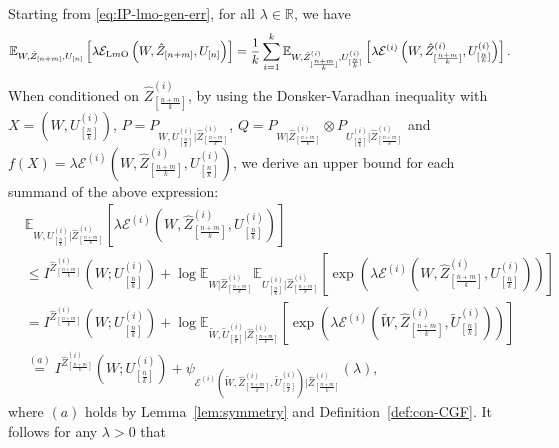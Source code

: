 \documentclass[onecolumn,romanappendices,10pt]{IEEEtran}
\newcommand{\Ecal}{{\mathcal E}}
\newcommand{\EE}{{\mathbb{E}}}
\newcommand{\RR}{{\mathbb{R}}}
\begin{document}
	Starting from \eqref{eq:IP-lmo-gen-err}, for all $\lambda \in \RR$, we have
	\begin{equation}
		\begin{aligned}
			\EE_{W, \hat{Z}_{[n+m]}, U_{[n]}} \left[ \lambda \Ecal_{\textnormal{L$m$O}}\left( W, \hat{Z}_{[n+m]}, U_{[n]} \right) \right] = \frac{1}{k} \sum_{i=1}^{k} \EE_{W, \hat{Z}^{(i)}_{[\frac{n+m}{k}]}, U^{(i)}_{[\frac{n}{k}]}} \left[ \lambda \Ecal^{(i)} \left( W, \hat{Z}^{(i)}_{[\frac{n+m}{k}]}, U^{(i)}_{[\frac{n}{k}]} \right) \right].
		\end{aligned}
	\end{equation}
	When conditioned on $\hat{Z}^{(i)}_{[\frac{n+m}{k}]}$, by using the Donsker-Varadhan inequality with $X = (W, U^{(i)}_{[\frac{n}{k}]})$, $P = P_{W, U^{(i)}_{[\frac{n}{k}]} | \hat{Z}^{(i)}_{[\frac{n+m}{k}]}}$, $Q = P_{W | \hat{Z}^{(i)}_{[\frac{n+m}{k}]}} \otimes P_{U^{(i)}_{[\frac{n}{k}]} | \hat{Z}^{(i)}_{[\frac{n+m}{k}]}}$ and $f(X) = \lambda \Ecal^{(i)} ( W, \hat{Z}^{(i)}_{[\frac{n+m}{k}]}, U^{(i)}_{[\frac{n}{k}]} )$, we derive an upper bound for each summand of the above expression:
	\begin{equation}
		\begin{aligned}
			&\EE_{W, U^{(i)}_{[\frac{n}{k}]} | \hat{Z}^{(i)}_{[\frac{n+m}{k}]}} \left[ \lambda \Ecal^{(i)} \left( W, \hat{Z}^{(i)}_{[\frac{n+m}{k}]}, U^{(i)}_{[\frac{n}{k}]} \right) \right] \\
			&\leq I^{\hat{Z}^{(i)}_{[\frac{n+m}{k}]}}\left( W; U^{(i)}_{[\frac{n}{k}]} \right) + \log \EE_{W | \hat{Z}^{(i)}_{[\frac{n+m}{k}]}} \EE_{U^{(i)}_{[\frac{n}{k}]} | \hat{Z}^{(i)}_{[\frac{n+m}{k}]}} \left[ \exp \left( \lambda \Ecal^{(i)} \left( W, \hat{Z}^{(i)}_{[\frac{n+m}{k}]}, U^{(i)}_{[\frac{n}{k}]} \right) \right) \right] \\
			&= I^{\hat{Z}^{(i)}_{[\frac{n+m}{k}]}}\left( W; U^{(i)}_{[\frac{n}{k}]} \right) + \log \EE_{\tilde{W}, \tilde{U}^{(i)}_{[\frac{n}{k}]} | \hat{Z}^{(i)}_{[\frac{n+m}{k}]}} \left[ \exp \left( \lambda \Ecal^{(i)} \left( \tilde{W}, \hat{Z}^{(i)}_{[\frac{n+m}{k}]}, \tilde{U}^{(i)}_{[\frac{n}{k}]} \right) \right) \right] \\
			&\overset{(a)}{=} I^{\hat{Z}^{(i)}_{[\frac{n+m}{k}]}}\left( W; U^{(i)}_{[\frac{n}{k}]} \right) + \psi_{\mathcal{E}^{(i)}(\tilde{W}, \hat{Z}^{(i)}_{[\frac{n+m}{k}]}, \tilde{U}^{(i)}_{[\frac{n}{k}]}) | \hat{Z}^{(i)}_{[\frac{n+m}{k}]}}(\lambda),
		\end{aligned}\label{eq:dv-IPCIMI}
	\end{equation}
	where $(a)$ holds by Lemma~\ref{lem:symmetry} and Definition~\ref{def:con-CGF}. It follows for any $\lambda >0$ that
\end{document}
